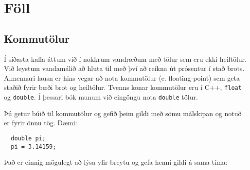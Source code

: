 





\chapter{Föll}

\section{Kommutölur}

Í síðasta kafla áttum við í nokkrum vandræðum með tölur sem eru ekki heiltölur.
Við leystum vandamálið að hluta til með því að reikna út prósentur í stað brots.
Almennari lausn er hins vegar að nota kommutölur (e. floating-point) sem geta staðið fyrir bæði brot og heiltölur.
Tvenns konar kommutölur eru í C++, {\tt float} og {\tt double}.
Í þessari bók munum við eingöngu nota {\tt double} tölur.

Þú getur búið til kommutölur og gefið þeim gildi með sömu málskipan og notuð er fyrir önnu tög.
Dæmi:

\begin{verbatim}
  double pi;
  pi = 3.14159;
\end{verbatim}
%
Það er einnig mögulegt að lýsa yfir breytu og gefa henni gildi á sama tíma:

